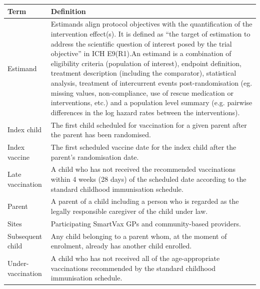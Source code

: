 \documentclass[
  bibliography=totoc]{scrreprt}
\begin{document}
\begin{table}[H]
\centering\begingroup\fontsize{10}{12}\selectfont

\begin{tabular}{l>{\raggedright\arraybackslash}p{25em}}
\toprule
Term & Definition\\
\midrule
Estimand & Estimands align protocol objectives with the quantification of the intervention effect(s). \newline     It is defined as “the target of estimation to address the scientific question of interest posed by the trial objective” in ICH E9(R1).\newline \newline     An estimand is a combination of eligibility criteria (population of interest), endpoint definition, treatment description (including the comparator), statistical analysis, treatment of intercurrent events post-randomisation (eg. missing values, non-compliance, use of rescue medication or interventions, etc.) and a population level summary (e.g. pairwise differences in the log hazard rates between the interventions).\newline \\
Index child & The first child scheduled for vaccination for a given parent after the parent has been randomised.\newline \\
Index vaccine & The first scheduled vaccine date for the index child after the parent’s randomisation date.\newline \\
Late vaccination & A child who has not received the recommended vaccinations within 4 weeks (28 days) of the scheduled date according to the standard childhood immunisation schedule.\newline \\
Parent & A parent of a child including a person who is regarded as the legally responsible caregiver of the child under law.\newline \\
Sites & Participating SmartVax GPs and community-based providers.\newline \\
Subsequent child & Any child belonging to a parent whom, at the moment of enrolment, already has another child enrolled.\newline \\
Under-vaccination & A child who has not received all of the age-appropriate vaccinations recommended by the standard childhood immunisation schedule.\newline \\
\bottomrule
\end{tabular}
\endgroup{}
\end{table}
\end{document}
